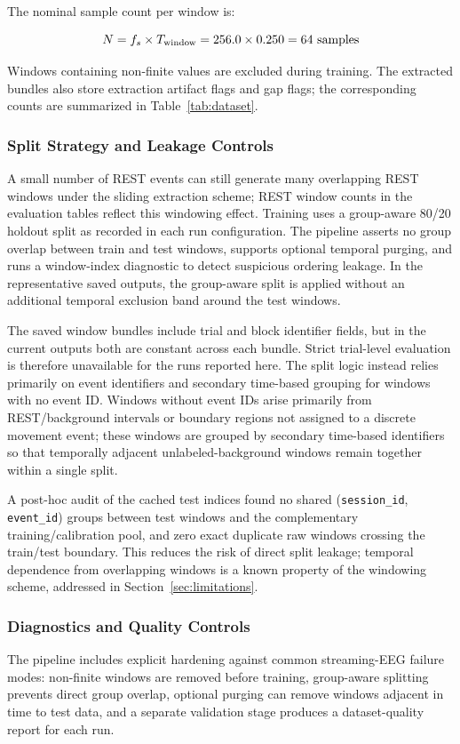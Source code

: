 \documentclass[conference]{IEEEtran}
\begin{document}
The nominal sample count per window is:

\[
N = f_s \times T_{\text{window}} = 256.0 \times 0.250 = 64~\text{samples}
\]

Windows containing non-finite values are excluded during training. The extracted bundles also store extraction artifact flags and gap flags; the corresponding counts are summarized in Table~\ref{tab:dataset}.



\subsubsection{Split Strategy and Leakage Controls}
A small number of REST events can still generate many overlapping REST windows under the sliding extraction scheme; REST window counts in the evaluation tables reflect this windowing effect. Training uses a group-aware 80/20 holdout split as recorded in each run configuration. The pipeline asserts no group overlap between train and test windows, supports optional temporal purging, and runs a window-index diagnostic to detect suspicious ordering leakage. In the representative saved outputs, the group-aware split is applied without an additional temporal exclusion band around the test windows.

The saved window bundles include trial and block identifier fields, but in the current outputs both are constant across each bundle. Strict trial-level evaluation is therefore unavailable for the runs reported here. The split logic instead relies primarily on event identifiers and secondary time-based grouping for windows with no event ID. Windows without event IDs arise primarily from REST/background intervals or boundary regions not assigned to a discrete movement event; these windows are grouped by secondary time-based identifiers so that temporally adjacent unlabeled-background windows remain together within a single split.

A post-hoc audit of the cached test indices found no shared (\texttt{session\_id}, \texttt{event\_id}) groups between test windows and the complementary training/calibration pool, and zero exact duplicate raw windows crossing the train/test boundary. This reduces the risk of direct split leakage; temporal dependence from overlapping windows is a known property of the windowing scheme, addressed in Section~\ref{sec:limitations}.

\subsubsection{Diagnostics and Quality Controls}
The pipeline includes explicit hardening against common streaming-EEG failure modes: non-finite windows are removed before training, group-aware splitting prevents direct group overlap, optional purging can remove windows adjacent in time to test data, and a separate validation stage produces a dataset-quality report for each run.
\end{document}
